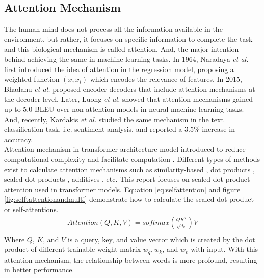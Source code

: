 \documentclass[%
	BCOR=8mm, %
	DIV=12,
	toc=bibliography, %
	toc=listof, %
	oneside, %
	egregdoesnotlikesansseriftitles, %
	]{scrbook}
\begin{document}
\subsection{Attention Mechanism}
The human mind does not process all the information available in the environment, but rather, it focuses on specific information to complete the task and this biological mechanism is called attention. And, the major intention behind achieving the same in machine learning tasks. In 1964, Naradaya \textit{et al.} \cite{nadaraya_estimating_1964} first introduced the idea of attention in the regression model, proposing a weighted function $(x,x_{i})$ which encodes the relevance of features. In 2015, Bhadanu \textit{et al.} \cite{bahdanau_neural_2014} proposed encoder-decoders that include attention mechanisms at the decoder level. Later, Luong \textit{et al.} \cite{luong_effective_2015} showed that attention mechanisms gained up to 5.0 BLEU over non-attention models in neural machine learning tasks. And, recently, Kardakis \textit{et al.} \cite{kardakis_examining_2021} studied the same mechanism in the text classification task, i.e. sentiment analysis, and reported a 3.5\% increase in accuracy.\\
Attention mechanism in transformer architecture model introduced to reduce computational complexity and facilitate computation \cite{vaswani_attention_2017}. Different types of methods exist to calculate attention mechanisms such as similarity-based \cite{graves_neural_2014}, dot products \cite{luong_effective_2015}, scaled dot products \cite{vaswani_attention_2017}, additives \cite{bahdanau_neural_2014}, etc. This report focuses on scaled dot product attention used in transformer models. Equation  \ref{eq:selfattention} and figure \ref{fig:selftattentionandmulti} demonstrate how to calculate the scaled dot product or self-attentions.
\begin{equation}
    \begin{aligned}
        Attention(Q,K,V)=softmax(\frac{QK^T}{\sqrt{d_{k}}})V\\
        \label{eq:selfattention}
    \end{aligned}
\end{equation}
Where $Q$, $K$, and $V$ is a query, key, and value vector which is created  by the dot product of different trainable weight matrix $w_{q},w_{k}$, and $ w_{v}$ with input. With this attention mechanism, the relationship between words is more profound, resulting in better performance.\\
\end{document}

